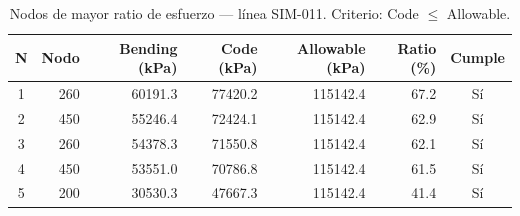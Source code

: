 \begin{table}[htbp]
  \centering
  \small
  \caption{Nodos de mayor ratio de esfuerzo — línea SIM-011. Criterio: Code $\leq$ Allowable.}
  \label{tab:top5-ratio}
  \begin{tabular}{crrrrrc}
    \toprule
    N & Nodo & Bending (\si{kPa}) & Code (\si{kPa}) & Allowable (\si{kPa}) & Ratio (\%) & Cumple \\
    \midrule
    1 & 260 & \num{60191.3} & \num{77420.2} & \num{115142.4} & 67.2 & Sí \\
    2 & 450 & \num{55246.4} & \num{72424.1} & \num{115142.4} & 62.9 & Sí \\
    3 & 260 & \num{54378.3} & \num{71550.8} & \num{115142.4} & 62.1 & Sí \\
    4 & 450 & \num{53551.0} & \num{70786.8} & \num{115142.4} & 61.5 & Sí \\
    5 & 200 & \num{30530.3} & \num{47667.3} & \num{115142.4} & 41.4 & Sí \\
    \bottomrule
  \end{tabular}
\end{table}
